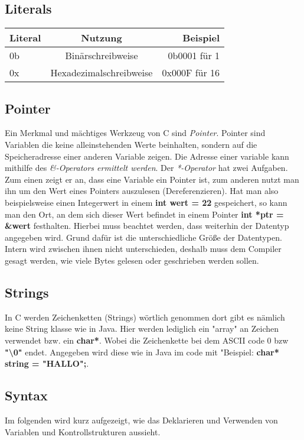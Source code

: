 \documentclass{article}
\begin{document}
\subsection{Literals}
\begin{center}
\begin{tabular}{| l | c | r |}
	\hline
	\textbf{Literal} & \textbf{Nutzung} &  \textbf{Beispiel} \\ \hline
    0b & Binärschreibweise & 0b0001 für 1\\
    0x & Hexadezimalschreibweise & 0x000F für 16\\
	\hline
\end{tabular}
\end{center}

\subsection{Pointer}
Ein Merkmal und mächtiges Werkzeug von C sind \textit{Pointer}. Pointer sind Variablen die keine alleinstehenden Werte beinhalten, sondern auf die Speicheradresse einer anderen Variable zeigen.
Die Adresse einer variable kann mithilfe des \textit{\&-Operators ermittelt werden}. Der \textit{*-Operator} hat zwei Aufgaben. Zum einen zeigt er an, dass eine Variable ein Pointer ist, zum anderen nutzt man ihn um den Wert eines Pointers auszulesen (Dereferenzieren).
Hat man also beispielsweise einen Integerwert in einem \textbf{int wert = 22} gespeichert, so kann man den Ort, an dem sich dieser Wert befindet in einem Pointer \textbf{int *ptr = \&wert} festhalten. Hierbei muss beachtet werden, dass weiterhin der Datentyp angegeben wird.
Grund dafür ist die unterschiedliche Größe der Datentypen. Intern wird zwischen ihnen nicht unterschieden, deshalb muss dem Compiler gesagt werden, wie viele Bytes gelesen oder geschrieben werden sollen.

\subsection{Strings}
In C werden Zeichenketten (Strings) wörtlich genommen dort gibt es nämlich keine String klasse wie in Java. Hier werden lediglich ein "array" an Zeichen verwendet bzw. ein \textbf{char*}. Wobei die Zeichenkette bei dem ASCII code 0 bzw \textbf{"\textbackslash 0"} endet. Angegeben wird diese wie in Java im code mit "\newline Beispiel: \textbf{char* string = "HALLO";}.

\subsection{Syntax}
Im folgenden wird kurz aufgezeigt, wie das Deklarieren und Verwenden von Variablen und Kontrollstrukturen aussieht.
\end{document}

